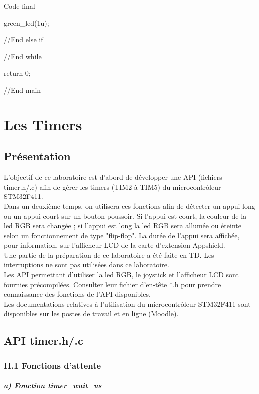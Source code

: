 {\begin{Cpp}{Code final}
{{{        green_led(1u);

      }//End else if

    }//End while

  return 0;
  }//End main

\end{Cpp}\part{Les Timers}
\chapter{Présentation}

L'objectif de ce laboratoire est d'abord de développer une API (fichiers timer.h/.c) afin de gérer les timers (TIM2 à TIM5) du microcontrôleur STM32F411.\\
Dans un deuxième temps, on utilisera ces fonctions afin de détecter un appui long ou un appui court sur un bouton poussoir. Si l'appui est court, la couleur de la led RGB sera changée ; si l'appui est long la led RGB sera allumée ou éteinte selon un fonctionnement de type "flip-flop". La durée de l'appui sera affichée, pour information, sur l'afficheur LCD de la carte d'extension Appshield. \\

Une partie de la préparation de ce laboratoire a été faite en TD. Les interruptions ne sont pas utilisées dans ce laboratoire. \\
Les API permettant d'utiliser la led RGB, le joystick et l'afficheur LCD sont fournies
précompilées. Consulter leur fichier d'en-tête *.h pour prendre connaissance des fonctions de l'API disponibles.\\
Les documentations relatives à l'utilisation du microcontrôleur STM32F411 sont disponibles
sur les postes de travail et en ligne (Moodle).



\chapter{API timer.h/.c}


\section{II.1 Fonctions d'attente}


\subsubsection{a) Fonction timer\_wait\_us}

}
